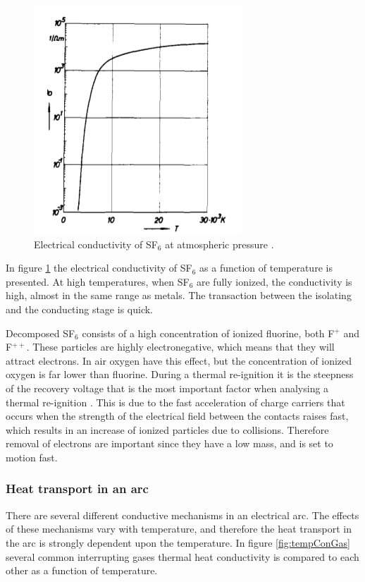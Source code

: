 \documentclass[10pt,a4paper,twoside]{article}
\begin{document}
\begin{figure}[H]
\centering
\includegraphics[scale=0.5]{Bilder/Theory/SF6Conduct.png}
\caption{Electrical conductivity of SF$_6$ at atmospheric pressure \cite{bib:IPSF6AQM}.} \label{fig:condSF6}
\end{figure}

In figure \ref{fig:condSF6} the electrical conductivity of SF$_6$ as a function of temperature is presented. At high temperatures, when SF$_6$ are fully ionized, the conductivity is high, almost in the same range as metals. The transaction between the isolating and the conducting stage is quick. 

Decomposed SF$_6$ consists of a high concentration of ionized fluorine, both F$^{+}$ and F$^{++}$. These particles are highly electronegative, which means that they will attract electrons. In air oxygen have this effect, but the concentration of ionized oxygen is far lower than fluorine. During a thermal re-ignition it is the steepness of the recovery voltage that is the most important factor when analysing a thermal re-ignition \cite{bib:HVEbreak}. This is due to the fast acceleration of charge carriers that occurs when the strength of the electrical field between the contacts raises fast, which results in an increase of ionized particles due to collisions. Therefore removal of electrons are important since they have a low mass, and is set to motion fast.
   
\subsubsection{Heat transport in an arc} \label{sec:HeatTransport}
There are several different conductive mechanisms in an electrical arc. The effects of these mechanisms vary with temperature, and therefore the heat transport in the arc is strongly dependent upon the temperature. In figure \ref{fig:tempConGas} several common interrupting gases thermal heat conductivity is compared to each other as a function of temperature.
\end{document}
